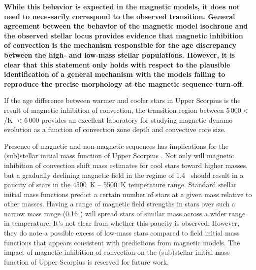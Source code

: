 \documentclass{aa}
\begin{document}
{\bf While this behavior is expected in the magnetic models, it does not need to necessarily correspond to the observed transition. General agreement between the behavior of the magnetic model isochrone and the observed stellar locus provides evidence that magnetic inhibition of convection is the mechanism responsible for the age discrepancy between the high- and low-mass stellar populations. However, it is clear that this statement only holds with respect to the plausible identification of a general mechanism with the models failing to reproduce the precise morphology at the magnetic sequence turn-off.}

If the age difference between warmer and cooler stars in Upper Scorpius is the result of magnetic inhibition of convection, the transition region between $5\,000 <$ \teff/K $< 6\,000$ provides an excellent laboratory for studying magnetic dynamo evolution as a function of convection zone depth and convective core size.


Presence of magnetic and non-magnetic sequences has implications for the (sub)stellar initial mass function of Upper Scorpius \citep{Ardila2000, Preibisch2002}. Not only will magnetic inhibition of convection shift mass estimates for cool stars toward higher masses, but a gradually declining magnetic field in the regime of 1.4 \msun\ should result in a paucity of stars in the 4500~K -- 5500~K temperature range. Standard stellar initial mass functions \citep[e.g.,][]{Salpeter1955, Kroupa2002} predict a certain number of stars at a given mass relative to other masses. Having a range of magnetic field strengths in stars over such a narrow mass range (0.16 \msun) will spread stars of similar mass across a wider range in temperature. It's not clear from \citet{Preibisch2002} whether this paucity is observed. However, they do note a possible excess of low-mass stars compared to field initial mass functions \citep{Scalo1998, Kroupa2002} that appears consistent with predictions from magnetic models. The impact of magnetic inhibition of convection on the (sub)stellar initial mass function of Upper Scorpius is reserved for future work.
\end{document}
